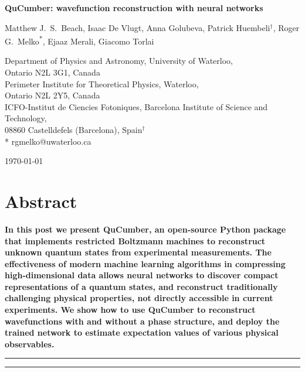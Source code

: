 \documentclass[submission, Phys]{SciPost}
\begin{document}
\begin{center}{\Large \textbf{
	QuCumber: wavefunction reconstruction with neural networks
}}\end{center}

\begin{center}
	Matthew J.~S.~Beach,
	Isaac De Vlugt,
	Anna Golubeva,
	Patrick Huembeli$^\dag$,
	Roger G.~Melko\textsuperscript{*},
	Ejaaz Merali,
	Giacomo Torlai
\end{center}

\begin{center}
	Department of Physics and Astronomy, University of Waterloo,
	\\Ontario N2L 3G1, Canada
	\\
	Perimeter Institute for Theoretical Physics, Waterloo,
	\\Ontario N2L 2Y5, Canada
	\\
	ICFO-Institut de Ciencies Fotoniques, Barcelona Institute of Science and Technology,
	\\08860 Castelldefels (Barcelona), Spain$^\dag$ \\
	* rgmelko@uwaterloo.ca \\
\end{center}

\begin{center}
	\today
\end{center}


\section*{Abstract}
{\bf
In this post we present QuCumber, an open-source Python package that implements restricted Boltzmann machines to reconstruct unknown quantum states from experimental measurements. The effectiveness of modern machine learning algorithms in compressing high-dimensional data allows neural networks to discover compact representations of a quantum states, and reconstruct traditionally challenging physical properties, not directly accessible in current experiments. We show how to use QuCumber to reconstruct wavefunctions with and without a phase structure, and deploy the trained network to estimate expectation values of various physical observables.}

\vspace{10pt}
\noindent\rule{\textwidth}{1pt}
\tableofcontents\thispagestyle{fancy}
\noindent\rule{\textwidth}{1pt}
\vspace{10pt}
\end{document}
